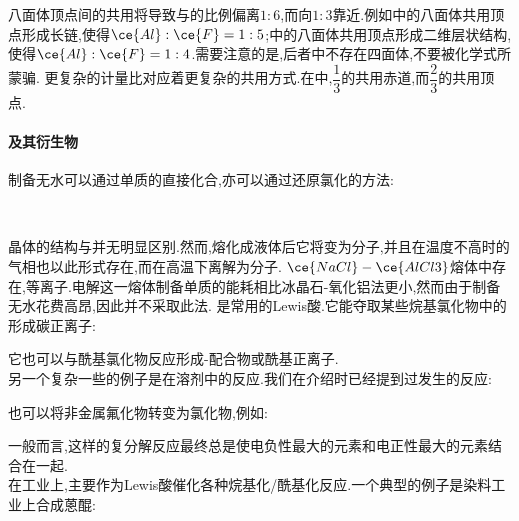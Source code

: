 \documentclass{ctexart}
\begin{document}
八面体顶点间的共用将导致与的比例偏离$1:6$,而向$1:3$靠近.例如中的八面体共用顶点形成长链,使得$\ce{Al}:\ce{F}=1:5$;中的八面体共用顶点形成二维层状结构,使得$\ce{Al}:\ce{F}=1:4$.需要注意的是,后者中不存在四面体,不要被化学式所蒙骗.
更复杂的计量比对应着更复杂的共用方式.在中,$\dfrac13$的共用赤道,而$\dfrac23$的共用顶点.
\paragraph{及其衍生物}
制备无水可以通过单质的直接化合,亦可以通过还原氯化的方法:
\begin{center}
    \\
\end{center}

\indent {}晶体的结构与并无明显区别.然而,熔化成液体后它将变为分子,并且在温度不高时的气相也以此形式存在,而在高温下离解为分子.
$\ce{NaCl}-\ce{AlCl3}$熔体中存在\ce{[AlCl4]-},\ce{[Al2Cl7]-}等离子.电解这一熔体制备单质的能耗相比冰晶石-氧化铝法更小,然而由于制备无水花费高昂,因此并不采取此法.
是常用的Lewis酸.它能夺取某些烷基氯化物中的形成碳正离子:
\begin{center}
\end{center}
它也可以与酰基氯化物反应形成-配合物或酰基正离子\ce{[RCO]+[AlCl4]-}.\\
\indent 另一个复杂一些的例子是在溶剂中的反应.我们在介绍时已经提到过发生的反应:
\begin{center}
\end{center}

\indent {}也可以将非金属氟化物转变为氯化物,例如:
\begin{center}
\end{center}
一般而言,这样的复分解反应最终总是使电负性最大的元素和电正性最大的元素结合在一起.\\
\indent 在工业上,主要作为Lewis酸催化各种烷基化/酰基化反应.一个典型的例子是染料工业上合成蒽醌:
\begin{center}
\end{center}
\end{document}
